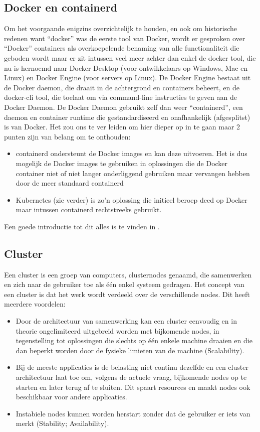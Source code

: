 \subsection{Docker en containerd}
Om het voorgaande enigzins overzichtelijk te houden, en ook om historische redenen want ``docker'' was de eerste tool van Docker, wordt er gesproken over ``Docker'' containers als overkoepelende benaming van alle functionaliteit die geboden wordt maar er zit intussen veel meer achter dan enkel de docker tool, die nu is hernoemd naar Docker Desktop (voor ontwikkelaars op Windows, Mac en Linux) en Docker Engine (voor servers op Linux).
De Docker Engine bestaat uit de Docker daemon, die draait in de achtergrond en containers beheert, en de docker-cli tool, die toelaat om via command-line instructies te geven aan de Docker Daemon.
De Docker Daemon gebruikt zelf dan weer ``containerd'', een daemon en container runtime die gestandardiseerd en onafhankelijk (afgesplitst) is van Docker. Het zou ons te ver leiden om hier dieper op in te gaan maar 2 punten zijn van belang om te onthouden:
\begin{itemize}
    \item containerd ondersteunt de Docker images en kan deze uitvoeren. Het is dus mogelijk de Docker images te gebruiken in oplossingen die de Docker container niet of niet langer onderliggend gebruiken maar vervangen hebben door de meer standaard containerd
    \item Kubernetes (zie verder) is zo'n oplossing die initieel beroep deed op Docker maar intussen containerd rechtstreeks gebruikt.
\end{itemize}

Een goede introductie tot dit alles is te vinden in \textcite{Donohue2023}.


\subsection{Cluster}
Een cluster is een groep van computers, clusternodes genaamd, die samenwerken en zich naar de gebruiker toe als \'e\'en enkel systeem gedragen. Het concept van een cluster is dat het werk wordt verdeeld over de verschillende nodes.
\newline
Dit heeft meerdere voordelen:
\begin{itemize}
    \item Door de architectuur van samenwerking kan een cluster eenvoudig en in theorie ongelimiteerd uitgebreid worden met bijkomende nodes, in tegenstelling tot oplossingen die slechts op \'e\'en enkele machine draaien en die dan beperkt worden door de fysieke limieten van de machine (Scalability).
    \item Bij de meeste applicaties is de belasting niet continu dezelfde en een cluster architectuur laat toe om, volgens de actuele vraag, bijkomende nodes op te starten en later terug af te sluiten. Dit spaart resources en maakt nodes ook beschikbaar voor andere applicaties.
    \item Instabiele nodes kunnen worden herstart zonder dat de gebruiker er iets van merkt (Stability; Availability).
\end{itemize}

